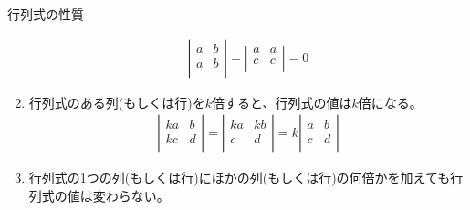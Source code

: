 \documentclass[a4paper]{jsarticle}
\begin{document}
\begin{itembox}[l]{行列式の性質}
\begin{enumerate}[(1)]
\begin{eqnarray*}
                  \left| \begin{array}{rr}
                      a & b \\
                      a & b \\
                  \end{array} \right|
                  =
                  \left| \begin{array}{rr}
                      a & a \\
                      c & c \\
                  \end{array} \right|
                  =0
              \end{eqnarray*}
        \item 行列式のある列(もしくは行)を$k$倍すると、行列式の値は$k$倍になる。
              \begin{eqnarray*}
                  \left| \begin{array}{rr}
                      ka & b \\
                      kc & d \\
                  \end{array} \right|
                  =
                  \left| \begin{array}{rr}
                      ka & kb \\
                      c  & d  \\
                  \end{array} \right|
                  =
                  k
                  \left| \begin{array}{rr}
                      a & b \\
                      c & d \\
                  \end{array} \right|
              \end{eqnarray*}
        \item 行列式の1つの列(もしくは行)にほかの列(もしくは行)の何倍かを加えても行列式の値は変わらない。
    \end{enumerate}
\end{itembox}
\end{document}
